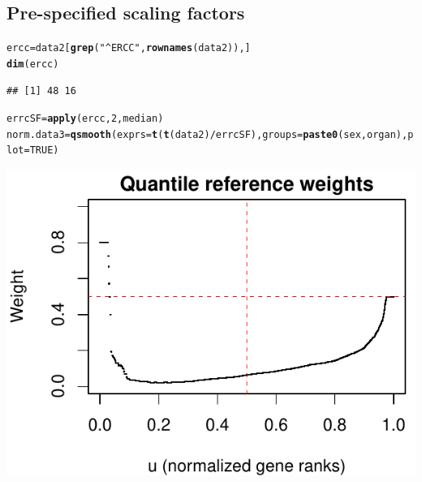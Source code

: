 \documentclass{article}\usepackage[]{graphicx}\usepackage[usenames,dvipsnames]{color}
\makeatletter
\def\maxwidth{ %
  \ifdim\Gin@nat@width>\linewidth
    \linewidth
  \else
    \Gin@nat@width
  \fi
}
\newcommand{\hlnum}[1]{\textcolor[rgb]{0.686,0.059,0.569}{#1}}%
\newcommand{\hlstr}[1]{\textcolor[rgb]{0.192,0.494,0.8}{#1}}%
\newcommand{\hlopt}[1]{\textcolor[rgb]{0,0,0}{#1}}%
\newcommand{\hlstd}[1]{\textcolor[rgb]{0.345,0.345,0.345}{#1}}%
\newcommand{\hlkwb}[1]{\textcolor[rgb]{0.69,0.353,0.396}{#1}}%
\newcommand{\hlkwc}[1]{\textcolor[rgb]{0.333,0.667,0.333}{#1}}%
\newcommand{\hlkwd}[1]{\textcolor[rgb]{0.737,0.353,0.396}{\textbf{#1}}}%
\newenvironment{kframe}{%
 \def\at@end@of@kframe{}%
 \ifinner\ifhmode%
  \def\at@end@of@kframe{\end{minipage}}%
  \begin{minipage}{\columnwidth}%
 \fi\fi%
 \def\FrameCommand##1{\hskip\@totalleftmargin \hskip-\fboxsep
 \colorbox{shadecolor}{##1}\hskip-\fboxsep
     \hskip-\linewidth \hskip-\@totalleftmargin \hskip\columnwidth}%
 \MakeFramed {\advance\hsize-\width
   \@totalleftmargin\z@ \linewidth\hsize
   \@setminipage}}%
 {\par\unskip\endMakeFramed%
 \at@end@of@kframe}
\newenvironment{knitrout}{}{} %
\makeatother
\begin{document}
\subsection{Pre-specified scaling factors}

\begin{knitrout}
\color{fgcolor}\begin{kframe}
\begin{alltt}
\hlstd{ercc} \hlkwb{=} \hlstd{data2[}\hlkwd{grep}\hlstd{(}\hlstr{"^ERCC"}\hlstd{,} \hlkwd{rownames}\hlstd{(data2)), ]}
\hlkwd{dim}\hlstd{(ercc)}
\end{alltt}
\begin{verbatim}
## [1] 48 16
\end{verbatim}
\begin{alltt}
\hlstd{errcSF} \hlkwb{=} \hlkwd{apply}\hlstd{(ercc,} \hlnum{2}\hlstd{, median)}
\hlstd{norm.data3} \hlkwb{=} \hlkwd{qsmooth}\hlstd{(}\hlkwc{exprs}\hlstd{=}\hlkwd{t}\hlstd{(}\hlkwd{t}\hlstd{(data2)}\hlopt{/}\hlstd{errcSF),} \hlkwc{groups}\hlstd{=}\hlkwd{paste0}\hlstd{(sex, organ),} \hlkwc{plot}\hlstd{=}\hlnum{TRUE}\hlstd{)}
\end{alltt}
\end{kframe}

{\centering \includegraphics[width=\maxwidth]{figure/qsmooth14-1} 

}



\end{knitrout}
\end{document}
